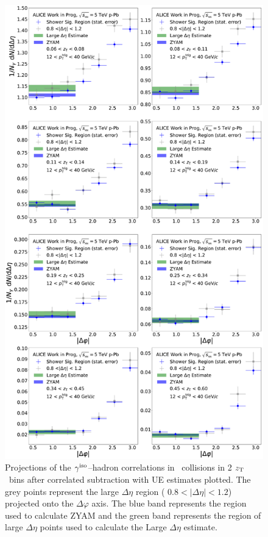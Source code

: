 \begin{figure}[htpb]
	\center
	\includegraphics[width=.99\textwidth]{Data_Analysis/G-H_New/UE_Plot_p-Pb_Single.pdf}
\caption{Projections of the $\gamma^\mathrm{iso}$--hadron correlations in \pPb~collisions in 2 $z_{\mathrm{T}}$~bins after correlated subtraction with UE estimates plotted. The grey points represent the large $\Delta\eta$ region ( $ 0.8 < |\Delta\eta| < 1.2$) projected onto the $\Delta\varphi$ axis. The blue band represents the region used to calculate ZYAM and the green band represents the region of large $\Delta\eta$ points used to calculate the Large $\Delta\eta$ estimate.}
\label{small_uncorr}
\end{figure}


